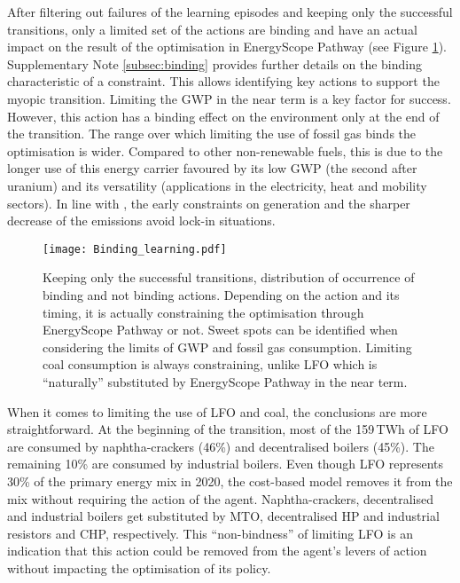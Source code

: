 \documentclass[11pt,twoside,a4paper,english]{article}
\begin{document}
After filtering out failures of the learning episodes and keeping only the successful transitions, only a limited set of the actions are binding and have an actual impact on the result of the optimisation in EnergyScope Pathway (see Figure \ref{fig:Binding_learning}). Supplementary Note \ref{subsec:binding} provides further details on the binding characteristic of a constraint. This allows identifying key actions to support the myopic transition. Limiting the \gls{GWP} in the near term is a key factor for success. However, this action has a binding effect on the environment only at the end of the transition. The range over which limiting the use of fossil gas binds the optimisation is wider. Compared to other non-renewable fuels, this is due to the longer use of this energy carrier favoured by its low \gls{GWP} (the second after uranium) and its versatility (applications in the electricity, heat and mobility sectors). In line with \citet{vogt2018starting}, the early constraints on generation and the sharper decrease of the emissions avoid lock-in situations.

\begin{figure}[!htbp]
\centering
\texttt{[image: Binding\_learning.pdf]}
\caption{Keeping only the successful transitions, distribution of occurrence of binding and not binding actions. Depending on the action and its timing, it is actually constraining the optimisation through EnergyScope Pathway or not. Sweet spots can be identified when considering the limits of \gls{GWP} and fossil gas consumption. Limiting coal consumption is always constraining, unlike \gls{LFO} which is ``naturally'' substituted by EnergyScope Pathway in the near term.}
\label{fig:Binding_learning}
\end{figure}

When it comes to limiting the use of \gls{LFO} and coal, the conclusions are more straightforward. At the beginning of the transition, most of the 159\,TWh of \gls{LFO} are consumed by naphtha-crackers (46\%) and decentralised boilers (45\%). The remaining 10\% are consumed by industrial boilers. Even though \gls{LFO} represents  30\% of the primary energy mix in 2020, the cost-based model removes it from the mix without requiring the action of the agent. Naphtha-crackers, decentralised and industrial boilers get substituted by \gls{MTO}, decentralised \gls{HP} and industrial resistors and \gls{CHP}, respectively.  This ``non-bindness'' of limiting \gls{LFO} is an indication that this action could be removed from the agent's levers of action without impacting the optimisation of its policy.
\end{document}
